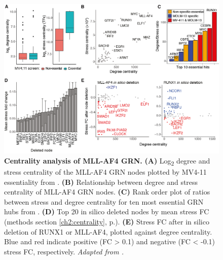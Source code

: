 \begin{figure}[!t]
    \centering
    \includegraphics[width=\textwidth,height=\textheight,keepaspectratio]{figures/chapter4/ch4_centrality.png}
    \caption[{Centrality analysis of MLL-AF4 GRN.}]
    {\textbf{Centrality analysis of MLL-AF4 GRN.} 
    \textbf{(A)} Log\textsubscript{2} degree and stress centrality of the MLL-AF4 GRN nodes plotted by MV4-11 essentiality from \cite{tzelepis_crispr_2016}. 
    \textbf{(B)} Relationship between degree and stress centrality of MLL-AF4 GRN nodes. 
    \textbf{(C)} Rank order plot of ratios between stress and degree centrality for ten most essential GRN hubs from \cite{tzelepis_crispr_2016}. 
    \textbf{(D)} Top 20 in silico deleted nodes by mean stress FC (methods section \ref{ch2:centrality}, p.\pageref{ch2:centrality}). 
    \textbf{(E)} Stress FC after in silico deletion of RUNX1 or MLL-AF4, plotted against degree centrality. Blue and red indicate positive (FC > 0.1) and negative (FC < -0.1) stress FC, respectively. 
    \textit{Adapted from \cite{harman_kmt2a-aff1_2021}.}
    }
    \label{fig:ch4_centrality}
\end{figure}

